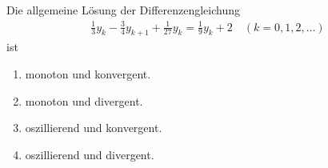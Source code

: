 \subsection*{}
Die allgemeine Lösung der  Differenzengleichung
\begin{align*}
\frac{1}{3} y_k - \frac{3}{4} y_{k+1} + \frac{1}{27} y_k  = \frac{1}{9} y_k + 2 \quad (k = 0,1,2,...)
\end{align*}
ist
\renewcommand{\labelenumi}{(\alph{enumi})}
\begin{enumerate}
	\item
	monoton und konvergent.
	\item
	monoton und divergent.	
	\item 
	oszillierend und konvergent.
	\item
	oszillierend und divergent.
\end{enumerate}